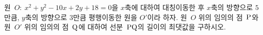원~$O:\ x^2+y^2-10x+2y+18=0$을 $x$축에 대하여 대칭이동한 후 $x$축의 방향으로 $5$만큼, $y$축의 방향으로 $3$만큼 평행이동한 원을 $O'$이라 하자. 원~$O$ 위의 임의의 점~$\mathrm{P}$와 원~$O'$ 위의 임의의 점~$\mathrm{Q}$에 대하여 선분~$\mathrm{PQ}$의 길이의 최댓값을 구하시오.
